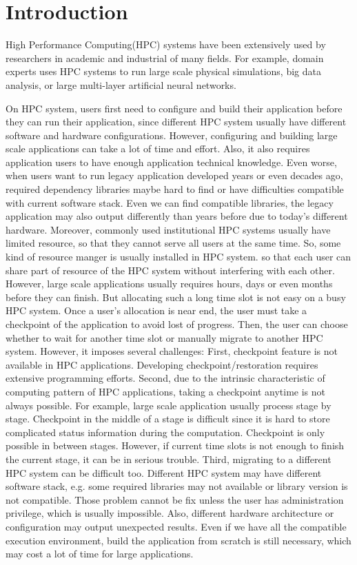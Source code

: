 \section{Introduction}
  \label{sec:introduction}

High Performance Computing(HPC) systems have been extensively used by researchers in academic and industrial of many fields. For example, domain experts uses HPC systems to run large scale physical simulations, big data analysis, or large multi-layer artificial neural networks. 

On HPC system, users first need to configure and build their application before they can run their application, since different HPC system usually have different software and hardware configurations. However, configuring and building large scale applications can take a lot of time and effort. Also, it also requires application users to have enough application technical knowledge. Even worse, when users want to run legacy application developed years or even decades ago, required dependency libraries maybe hard to find or have difficulties compatible with current software stack. Even we can find compatible libraries, the legacy application may also output differently than years before due to today's different hardware. Moreover, commonly used institutional HPC systems usually have limited resource, so that they cannot serve all users at the same time. So, some kind of resource manger is usually installed in HPC system. so that each user can share part of resource of the HPC system without interfering with each other. However, large scale applications usually requires hours, days or even months before they can finish. But allocating such a long time slot is not easy on a busy HPC system. Once a user's allocation is near end, the user must take a checkpoint of the application to avoid lost of progress. Then, the user can choose whether to wait for another time slot or manually migrate to another HPC system. However, it imposes several challenges: First, checkpoint feature is not available in HPC applications. Developing checkpoint/restoration requires extensive programming efforts. Second, due to the intrinsic characteristic of computing pattern of HPC applications, taking a checkpoint anytime is not always possible. For example, large scale application usually process stage by stage. Checkpoint in the middle of a stage is difficult since it is hard to store complicated status information during the computation. Checkpoint is only possible in between stages. However, if current time slots is not enough to finish the current stage, it can be in serious trouble. Third, migrating to a different HPC system can be difficult too. Different HPC system may have different software stack, e.g. some required libraries may not available or library version is not compatible. Those problem cannot be fix unless the user has administration privilege, which is usually impossible. Also, different hardware architecture or configuration may output unexpected results. Even if we have all the compatible execution environment, build the application from scratch is still necessary, which may cost a lot of time for large applications.   

